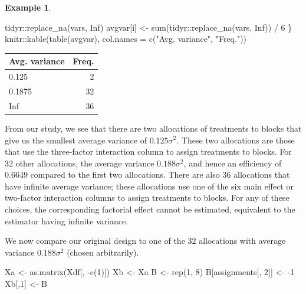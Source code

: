 \documentclass[
]{book}
\newenvironment{Shaded}{\begin{snugshade}}{\end{snugshade}}
\newcommand{\AttributeTok}[1]{\textcolor[rgb]{0.77,0.63,0.00}{#1}}
\newcommand{\ConstantTok}[1]{\textcolor[rgb]{0.00,0.00,0.00}{#1}}
\newcommand{\DecValTok}[1]{\textcolor[rgb]{0.00,0.00,0.81}{#1}}
\newcommand{\FunctionTok}[1]{\textcolor[rgb]{0.00,0.00,0.00}{#1}}
\newcommand{\NormalTok}[1]{#1}
\newcommand{\OtherTok}[1]{\textcolor[rgb]{0.56,0.35,0.01}{#1}}
\newcommand{\SpecialCharTok}[1]{\textcolor[rgb]{0.00,0.00,0.00}{#1}}
\newcommand{\StringTok}[1]{\textcolor[rgb]{0.31,0.60,0.02}{#1}}
\theoremstyle{definition}
\theoremstyle{definition}
\newtheorem{example}{Example}[chapter]
\theoremstyle{definition}
\theoremstyle{definition}
\theoremstyle{remark}
\begin{document}
\begin{example}
\begin{Shaded}
\begin{Highlighting}[]
\NormalTok{  tidyr}\SpecialCharTok{::}\FunctionTok{replace\_na}\NormalTok{(vars, }\ConstantTok{Inf}\NormalTok{)}
\NormalTok{  avgvar[i] }\OtherTok{\textless{}{-}} \FunctionTok{sum}\NormalTok{(tidyr}\SpecialCharTok{::}\FunctionTok{replace\_na}\NormalTok{(vars, }\ConstantTok{Inf}\NormalTok{)) }\SpecialCharTok{/} \DecValTok{6}
\NormalTok{\}}
\NormalTok{knitr}\SpecialCharTok{::}\FunctionTok{kable}\NormalTok{(}\FunctionTok{table}\NormalTok{(avgvar), }\AttributeTok{col.names =} \FunctionTok{c}\NormalTok{(}\StringTok{"Avg. variance"}\NormalTok{, }\StringTok{"Freq."}\NormalTok{))}
\end{Highlighting}
\end{Shaded}

\begin{tabular}{l|r}
\hline
Avg. variance & Freq.\\
\hline
0.125 & 2\\
\hline
0.1875 & 32\\
\hline
Inf & 36\\
\hline
\end{tabular}

From our study, we see that there are two allocations of treatments to blocks that give us the smallest average variance of \(0.125\sigma^2\). These two allocations are those that use the three-factor interaction column to assign treatments to blocks. For 32 other allocations, the average variance \(0.188\sigma^2\), and hence an efficiency of \(0.6649\) compared to the first two allocations. There are also 36 allocations that have infinite average variance; these allocations use one of the six main effect or two-factor interaction columns to assign treatments to blocks. For any of these choices, the corresponding factorial effect cannot be estimated, equivalent to the estimator having infinite variance.

We now compare our original design to one of the 32 allocations with average variance \(0.188\sigma^2\) (chosen arbitrarily).

\begin{Shaded}
\begin{Highlighting}[]
\NormalTok{Xa }\OtherTok{\textless{}{-}} \FunctionTok{as.matrix}\NormalTok{(Xdf[, }\SpecialCharTok{{-}}\FunctionTok{c}\NormalTok{(}\DecValTok{1}\NormalTok{)])}
\NormalTok{Xb }\OtherTok{\textless{}{-}}\NormalTok{ Xa}
\NormalTok{B }\OtherTok{\textless{}{-}} \FunctionTok{rep}\NormalTok{(}\DecValTok{1}\NormalTok{, }\DecValTok{8}\NormalTok{)}
\NormalTok{B[assignments[, }\DecValTok{2}\NormalTok{]] }\OtherTok{\textless{}{-}} \SpecialCharTok{{-}}\DecValTok{1}
\NormalTok{Xb[,}\DecValTok{1}\NormalTok{] }\OtherTok{\textless{}{-}}\NormalTok{ B}
\end{Highlighting}
\end{Shaded}


\end{example}
\end{document}
